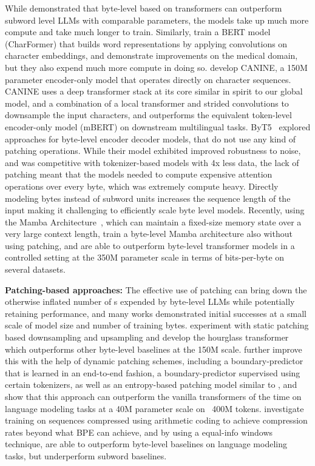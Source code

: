 \documentclass[]{fairmeta}
\begin{document}
While \cite{Choe2019BridgingTG} demonstrated that byte-level \llms{} based on transformers can outperform subword level LLMs with comparable parameters, the models take up much more compute and take much longer to train. Similarly, \cite{el2020characterbert} train a BERT model (CharFormer) that builds word representations by applying convolutions on character embeddings, and demonstrate improvements on the medical domain, but they also expend much more compute in doing so. \cite{clark2022canine} develop CANINE, a 150M parameter encoder-only model that operates directly on character sequences. CANINE uses a deep transformer stack at its core similar in spirit to our global model, and a combination of a local transformer and strided convolutions to downsample the input characters, and outperforms the equivalent token-level encoder-only model (mBERT) on downstream multilingual tasks. ByT5~\citep{xue2022byt5} explored approaches for byte-level encoder decoder models, that do not use any kind of patching operations. While their model exhibited improved robustness to noise, and was competitive with tokenizer-based models with 4x less data, the lack of patching meant that the models needed to compute expensive attention operations over every byte, which was extremely compute heavy. Directly modeling bytes instead of subword units increases the sequence length of the input making it challenging to efficiently scale byte level models. Recently, using the Mamba Architecture~\citep{gu2023mamba},  which can maintain a fixed-size memory state over a very large context length, \cite{wang2024mambabyte} train a byte-level Mamba architecture also without using patching, and are able to outperform byte-level transformer models in a \flop{} controlled setting at the 350M parameter scale in terms of bits-per-byte on several datasets.  


\textbf{Patching-based approaches:} The effective use of patching can bring down the otherwise inflated number of \flop{}s expended by byte-level LLMs while potentially retaining performance, and many works demonstrated initial successes at a small scale of model size and number of training bytes. \cite{nawrot-etal-2022-hierarchical} experiment with static patching based downsampling and upsampling and develop the hourglass transformer which outperforms other byte-level baselines at the 150M scale. \cite{nawrot-etal-2023-efficient} further improve this with the help of dynamic patching schemes, including a boundary-predictor that is learned in an end-to-end fashion, a boundary-predictor supervised using certain tokenizers, as well as an entropy-based patching model similar to \model{}, and show that this approach can outperform the vanilla transformers of the time on language modeling tasks at a 40M parameter scale on ~400M tokens. \cite{lester2024training} investigate training on sequences compressed using arithmetic coding to achieve compression rates beyond what BPE can achieve, and by using a equal-info windows technique, are able to outperform byte-level baselines on language modeling tasks, but underperform subword baselines.
\end{document}
